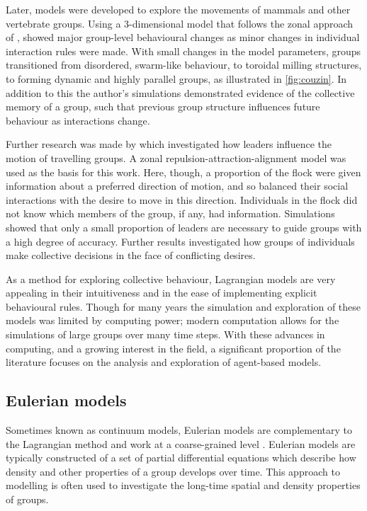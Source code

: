 Later, models were developed to explore the movements of mammals and other vertebrate groups. Using a 3-dimensional model that follows the zonal approach of \textcite{aoki82}, \textcite{couzin02} showed major group-level behavioural changes as minor changes in individual interaction rules were made. With small changes in the model parameters, groups transitioned from disordered, swarm-like behaviour, to toroidal milling structures, to forming dynamic and highly parallel groups, as illustrated in \cref{fig:couzin}. In addition to this the author's simulations demonstrated evidence of the collective memory of a group, such that previous group structure influences future behaviour as interactions change.

Further research was made by \textcite{couzin05} which investigated how leaders influence the motion of travelling groups. A zonal repulsion-attraction-alignment model was used as the basis for this work. Here, though, a proportion of the flock were given information about a preferred direction of motion, and so balanced their social interactions with the desire to move in this direction. Individuals in the flock did not know which members of the group, if any, had information. Simulations showed that only a small proportion of leaders are necessary to guide groups with a high degree of accuracy. Further results investigated how groups of individuals make collective decisions in the face of conflicting desires.

As a method for exploring collective behaviour, Lagrangian models are very appealing in their intuitiveness and in the ease of implementing explicit behavioural rules. Though for many years the simulation and exploration of these models was limited by computing power; modern computation allows for the simulations of large groups over many time steps. With these advances in computing, and a growing interest in the field, a significant proportion of the literature focuses on the analysis and exploration of agent-based models.

\subsection{Eulerian models}
\label{ssec:eulerian_models}

Sometimes known as continuum models, Eulerian models are complementary to the Lagrangian method and work at a coarse-grained level \parencite{giardina08}. Eulerian models are typically constructed of a set of partial differential equations which describe how density and other properties of a group develops over time. This approach to modelling is often used to investigate the long-time spatial and density properties of groups.

